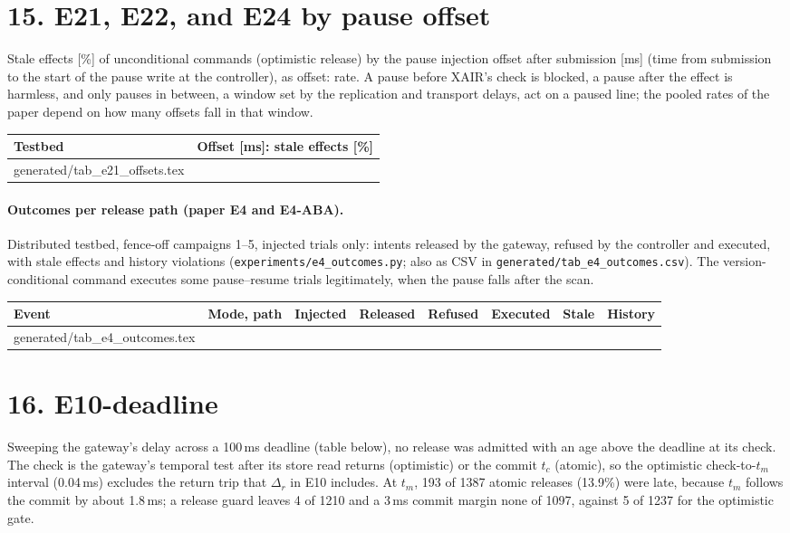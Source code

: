 \documentclass[11pt]{article}
\makeatletter
\newcommand{\gen}[1]{\@@input generated/#1.tex }
\makeatother
\begin{document}
\section*{15. E21, E22, and E24 by pause offset}
Stale effects [\%] of unconditional commands (optimistic release) by the pause injection offset after submission [ms] (time from submission to the start of the pause write at the controller), as offset: rate. A pause before XAIR's check is blocked, a pause after the effect is harmless, and only pauses in between, a window set by the replication and transport delays, act on a paused line; the pooled rates of the paper depend on how many offsets fall in that window.
\begin{center}\small
\begin{tabularx}{\linewidth}{@{}lX@{}}
\toprule
\textbf{Testbed} & \textbf{Offset [ms]: stale effects [\%]} \\
\midrule
\gen{tab_e21_offsets}
\bottomrule
\end{tabularx}
\end{center}

\paragraph{Outcomes per release path (paper E4 and E4-ABA).} Distributed testbed, fence-off campaigns 1--5, injected trials only: intents released by the gateway, refused by the controller and executed, with stale effects and history violations (\texttt{experiments/e4\_outcomes.py}; also as CSV in \texttt{generated/tab\_e4\_outcomes.csv}). The version-conditional command executes some pause--resume trials legitimately, when the pause falls after the scan.
\begin{center}\small
\begin{tabular}{@{}llrrrrrr@{}}
\toprule
\textbf{Event} & \textbf{Mode, path} & \textbf{Injected} & \textbf{Released} & \textbf{Refused} & \textbf{Executed} & \textbf{Stale} & \textbf{History} \\
\midrule
\gen{tab_e4_outcomes}
\bottomrule
\end{tabular}
\end{center}

\section*{16. E10-deadline}
Sweeping the gateway's delay across a 100\,ms deadline (table below), no release was admitted with an age above the deadline at its check. The check is the gateway's temporal test after its store read returns (optimistic) or the commit $t_c$ (atomic), so the optimistic check-to-$t_m$ interval (0.04\,ms) excludes the return trip that $\Delta_r$ in E10 includes. At $t_m$, 193 of 1387 atomic releases (13.9\%) were late, because $t_m$ follows the commit by about 1.8\,ms; a release guard leaves 4 of 1210 and a 3\,ms commit margin none of 1097, against 5 of 1237 for the optimistic gate.
\end{document}
